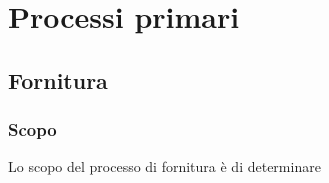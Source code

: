 \section{Processi primari}
\subsection{Fornitura}
\subsubsection{Scopo}
Lo scopo del processo di fornitura è di determinare 